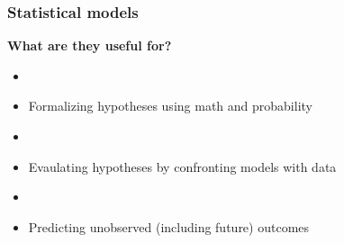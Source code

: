 \documentclass[color=usenames,dvipsnames]{beamer}\usepackage[]{graphicx}\usepackage[]{color}
\begin{document}
\begin{frame}
\begin{columns}
\begin{column}[T]{0.15\textwidth}
    \end{column}
  \end{columns}
\end{frame}




\begin{frame}
  \frametitle{Statistical models}
  \large
  {\bf What are they \alert{useful} for?}
  \begin{itemize}%
    \item[]
    \item<2-> Formalizing hypotheses using math and probability
    \item[]
    \item<3-> Evaulating hypotheses by confronting models with data
    \item[]
    \item<4-> Predicting unobserved (including future) outcomes
  \end{itemize}
  \vfill
  \centering
   \\
\end{frame}
\end{document}
